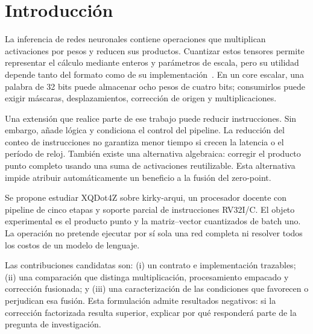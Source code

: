 \section{Introducción}
La inferencia de redes neuronales contiene operaciones que multiplican
activaciones por pesos y reducen sus productos. Cuantizar estos tensores
permite representar el cálculo mediante enteros y parámetros de escala,
pero su utilidad depende tanto del formato como de su implementación~\cite{jacob}.
En un core escalar, una palabra de 32 bits puede almacenar ocho pesos de
cuatro bits; consumirlos puede exigir máscaras, desplazamientos, corrección
de origen y multiplicaciones.

Una extensión que realice parte de ese trabajo puede reducir instrucciones.
Sin embargo, añade lógica y condiciona el control del pipeline. La reducción
del conteo de instrucciones no garantiza menor tiempo si crecen la latencia
o el período de reloj. También existe una alternativa algebraica: corregir
el producto punto completo usando una suma de activaciones reutilizable.
Esta alternativa impide atribuir automáticamente un beneficio a la fusión
del zero-point.

Se propone estudiar XQDot4Z sobre kirky-arqui, un procesador docente con
pipeline de cinco etapas y soporte parcial de instrucciones RV32I/C. El objeto
experimental es el producto punto y la matriz--vector cuantizados de batch
uno. La operación no pretende ejecutar por sí sola una red completa ni
resolver todos los costos de un modelo de lenguaje.

Las contribuciones candidatas son: (i) un contrato e implementación trazables;
(ii) una comparación que distinga multiplicación, procesamiento empacado y
corrección fusionada; y (iii) una caracterización de las condiciones que
favorecen o perjudican esa fusión. Esta formulación admite resultados negativos:
si la corrección factorizada resulta superior, explicar por qué responderá
parte de la pregunta de investigación.
